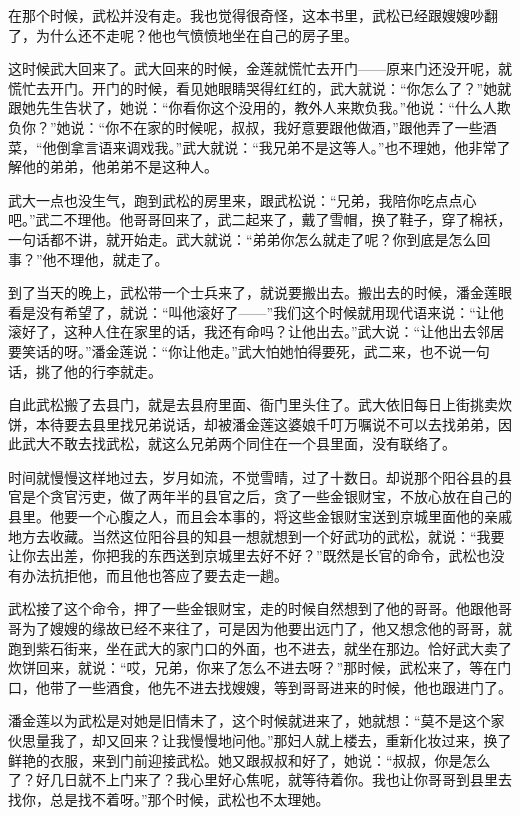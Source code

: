 \par 在那个时候，武松并没有走。我也觉得很奇怪，这本书里，武松已经跟嫂嫂吵翻了，为什么还不走呢？他也气愤愤地坐在自己的房子里。
\par 这时候武大回来了。武大回来的时候，金莲就慌忙去开门——原来门还没开呢，就慌忙去开门。开门的时候，看见她眼睛哭得红红的，武大就说：“你怎么了？”她就跟她先生告状了，她说：“你看你这个没用的，教外人来欺负我。”他说：“什么人欺负你？”她说：“你不在家的时候呢，叔叔，我好意要跟他做酒，”跟他弄了一些酒菜，“他倒拿言语来调戏我。”武大就说：“我兄弟不是这等人。”也不理她，他非常了解他的弟弟，他弟弟不是这种人。
\par 武大一点也没生气，跑到武松的房里来，跟武松说：“兄弟，我陪你吃点点心吧。”武二不理他。他哥哥回来了，武二起来了，戴了雪帽，换了鞋子，穿了棉袄，一句话都不讲，就开始走。武大就说：“弟弟你怎么就走了呢？你到底是怎么回事？”他不理他，就走了。
\par 到了当天的晚上，武松带一个士兵来了，就说要搬出去。搬出去的时候，潘金莲眼看是没有希望了，就说：“叫他滚好了——”我们这个时候就用现代语来说：“让他滚好了，这种人住在家里的话，我还有命吗？让他出去。”武大说：“让他出去邻居要笑话的呀。”潘金莲说：“你让他走。”武大怕她怕得要死，武二来，也不说一句话，挑了他的行李就走。
\par 自此武松搬了去县门，就是去县府里面、衙门里头住了。武大依旧每日上街挑卖炊饼，本待要去县里找兄弟说话，却被潘金莲这婆娘千叮万嘱说不可以去找弟弟，因此武大不敢去找武松，就这么兄弟两个同住在一个县里面，没有联络了。
\par 时间就慢慢这样地过去，岁月如流，不觉雪晴，过了十数日。却说那个阳谷县的县官是个贪官污吏，做了两年半的县官之后，贪了一些金银财宝，不放心放在自己的县里。他要一个心腹之人，而且会本事的，将这些金银财宝送到京城里面他的亲戚地方去收藏。当然这位阳谷县的知县一想就想到一个好武功的武松，就说：“我要让你去出差，你把我的东西送到京城里去好不好？”既然是长官的命令，武松也没有办法抗拒他，而且他也答应了要去走一趟。
\par 武松接了这个命令，押了一些金银财宝，走的时候自然想到了他的哥哥。他跟他哥哥为了嫂嫂的缘故已经不来往了，可是因为他要出远门了，他又想念他的哥哥，就跑到紫石街来，坐在武大的家门口的外面，也不进去，就坐在那边。恰好武大卖了炊饼回来，就说：“哎，兄弟，你来了怎么不进去呀？”那时候，武松来了，等在门口，他带了一些酒食，他先不进去找嫂嫂，等到哥哥进来的时候，他也跟进门了。
\par 潘金莲以为武松是对她是旧情未了，这个时候就进来了，她就想：“莫不是这个家伙思量我了，却又回来？让我慢慢地问他。”那妇人就上楼去，重新化妆过来，换了鲜艳的衣服，来到门前迎接武松。她又跟叔叔和好了，她说：“叔叔，你是怎么了？好几日就不上门来了？我心里好心焦呢，就等待着你。我也让你哥哥到县里去找你，总是找不着呀。”那个时候，武松也不太理她。
